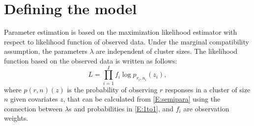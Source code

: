\documentclass[reqno]{amsart}
\begin{document}
\section{Defining the model}

Parameter estimation is based on the maximization likelihood estimator with respect to likelihood function of observed data. Under the marginal compatibility assumption, the parameters ${\lambda}$ are independent of cluster sizes. The likelihood function based on the observed data is written as follows:
\begin{equation}\label{D:imcompleteL}
	L = {\prod_{i=1}^{I}} f_i\log p_{r_i,n_i}(z_i),
\end{equation}
where $p(r,n)(z)$ is the probability of observing $r$ responses in a cluster of size $n$ given covariates $z$, that can be calculated from \eqref{E:semipara} using the connection between $\lambda$s and probabilities in \eqref{E:1to1}, and $f_i$ are observation weights.
\end{document}

